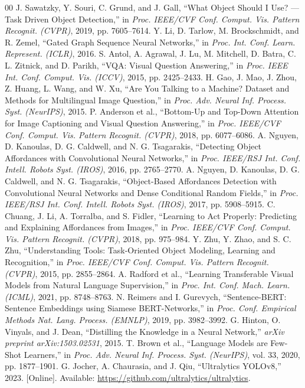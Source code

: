 \documentclass[conference]{IEEEtran}
\begin{document}
\begin{thebibliography}{00}
 J. Sawatzky, Y. Souri, C. Grund, and J. Gall, ``What Object Should I Use? --- Task Driven Object Detection,'' in \textit{Proc. IEEE/CVF Conf. Comput. Vis. Pattern Recognit. (CVPR)}, 2019, pp. 7605--7614.
 Y. Li, D. Tarlow, M. Brockschmidt, and R. Zemel, ``Gated Graph Sequence Neural Networks,'' in \textit{Proc. Int. Conf. Learn. Represent. (ICLR)}, 2016.
 S. Antol, A. Agrawal, J. Lu, M. Mitchell, D. Batra, C. L. Zitnick, and D. Parikh, ``VQA: Visual Question Answering,'' in \textit{Proc. IEEE Int. Conf. Comput. Vis. (ICCV)}, 2015, pp. 2425--2433.
 H. Gao, J. Mao, J. Zhou, Z. Huang, L. Wang, and W. Xu, ``Are You Talking to a Machine? Dataset and Methods for Multilingual Image Question,'' in \textit{Proc. Adv. Neural Inf. Process. Syst. (NeurIPS)}, 2015.
 P. Anderson et al., ``Bottom-Up and Top-Down Attention for Image Captioning and Visual Question Answering,'' in \textit{Proc. IEEE/CVF Conf. Comput. Vis. Pattern Recognit. (CVPR)}, 2018, pp. 6077--6086.
 A. Nguyen, D. Kanoulas, D. G. Caldwell, and N. G. Tsagarakis, ``Detecting Object Affordances with Convolutional Neural Networks,'' in \textit{Proc. IEEE/RSJ Int. Conf. Intell. Robots Syst. (IROS)}, 2016, pp. 2765--2770.
 A. Nguyen, D. Kanoulas, D. G. Caldwell, and N. G. Tsagarakis, ``Object-Based Affordances Detection with Convolutional Neural Networks and Dense Conditional Random Fields,'' in \textit{Proc. IEEE/RSJ Int. Conf. Intell. Robots Syst. (IROS)}, 2017, pp. 5908--5915.
 C. Chuang, J. Li, A. Torralba, and S. Fidler, ``Learning to Act Properly: Predicting and Explaining Affordances from Images,'' in \textit{Proc. IEEE/CVF Conf. Comput. Vis. Pattern Recognit. (CVPR)}, 2018, pp. 975--984.
 Y. Zhu, Y. Zhao, and S. C. Zhu, ``Understanding Tools: Task-Oriented Object Modeling, Learning and Recognition,'' in \textit{Proc. IEEE/CVF Conf. Comput. Vis. Pattern Recognit. (CVPR)}, 2015, pp. 2855--2864.
 A. Radford et al., ``Learning Transferable Visual Models from Natural Language Supervision,'' in \textit{Proc. Int. Conf. Mach. Learn. (ICML)}, 2021, pp. 8748--8763.
 N. Reimers and I. Gurevych, ``Sentence-BERT: Sentence Embeddings using Siamese BERT-Networks,'' in \textit{Proc. Conf. Empirical Methods Nat. Lang. Process. (EMNLP)}, 2019, pp. 3982--3992.
 G. Hinton, O. Vinyals, and J. Dean, ``Distilling the Knowledge in a Neural Network,'' \textit{arXiv preprint arXiv:1503.02531}, 2015.
 T. Brown et al., ``Language Models are Few-Shot Learners,'' in \textit{Proc. Adv. Neural Inf. Process. Syst. (NeurIPS)}, vol. 33, 2020, pp. 1877--1901.
 G. Jocher, A. Chaurasia, and J. Qiu, ``Ultralytics YOLOv8,'' 2023. [Online]. Available: \url{https://github.com/ultralytics/ultralytics}.
\end{thebibliography}
\end{document}
